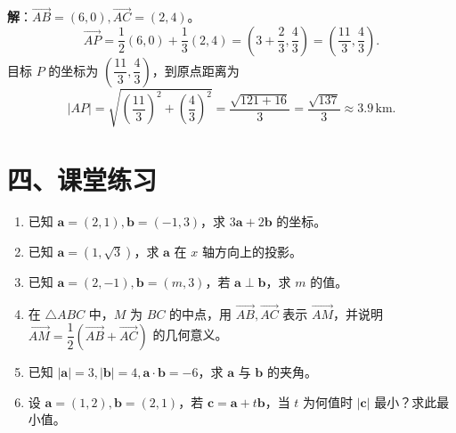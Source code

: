\documentclass[12pt, a4paper]{ctexart}
\begin{document}
\noindent\textbf{解}：$\overrightarrow{AB}=(6,0),\overrightarrow{AC}=(2,4)$。
\[
  \overrightarrow{AP}=\frac{1}{2}(6,0)+\frac{1}{3}(2,4)=\left(3+\frac{2}{3},\frac{4}{3}\right)=\left(\frac{11}{3},\frac{4}{3}\right).
\]
目标 $P$ 的坐标为 $\left(\dfrac{11}{3},\dfrac{4}{3}\right)$，到原点距离为
\[
  |AP|=\sqrt{\left(\frac{11}{3}\right)^2+\left(\frac{4}{3}\right)^2}=\frac{\sqrt{121+16}}{3}=\frac{\sqrt{137}}{3}\approx3.9\,\text{km}.
\]

\section*{\textcolor{tipgreen}{四、课堂练习}}

\begin{enumerate}[leftmargin=2em]
  \item 已知 $\boldsymbol{a}=(2,1),\boldsymbol{b}=(-1,3)$，求 $3\boldsymbol{a}+2\boldsymbol{b}$ 的坐标。

  \item 已知 $\boldsymbol{a}=(1,\sqrt{3})$，求 $\boldsymbol{a}$ 在 $x$ 轴方向上的投影。

  \item 已知 $\boldsymbol{a}=(2,-1),\boldsymbol{b}=(m,3)$，若 $\boldsymbol{a}\perp\boldsymbol{b}$，求 $m$ 的值。

  \item 在 $\triangle ABC$ 中，$M$ 为 $BC$ 的中点，用 $\overrightarrow{AB},\overrightarrow{AC}$ 表示 $\overrightarrow{AM}$，并说明 $\overrightarrow{AM}=\dfrac{1}{2}(\overrightarrow{AB}+\overrightarrow{AC})$ 的几何意义。

  \item 已知 $|\boldsymbol{a}|=3,|\boldsymbol{b}|=4,\boldsymbol{a}\cdot\boldsymbol{b}=-6$，求 $\boldsymbol{a}$ 与 $\boldsymbol{b}$ 的夹角。

  \item 设 $\boldsymbol{a}=(1,2),\boldsymbol{b}=(2,1)$，若 $\boldsymbol{c}=\boldsymbol{a}+t\boldsymbol{b}$，当 $t$ 为何值时 $|\boldsymbol{c}|$ 最小？求此最小值。
\end{enumerate}

\vspace{12pt}
\end{document}
